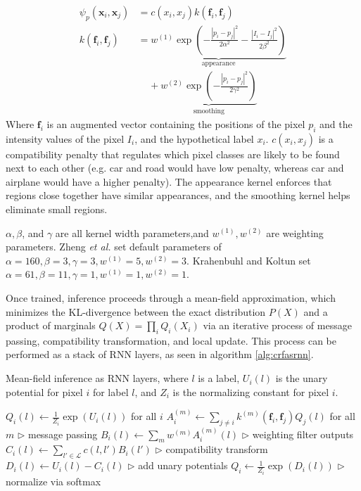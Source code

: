 \documentclass[10pt,twocolumn,letterpaper]{article}
\begin{document}
\begin{equation}
\begin{aligned}
\psi_p(\mathbf{x}_i, \mathbf{x}_j) &= c(x_i, x_j) k(\mathbf{f}_i, \mathbf{f}_j) \\
 k(\mathbf{f}_i, \mathbf{f}_j) &= \underbrace{w^{(1)} \exp \left( - \frac{|p_i - p_j|^2}{2\alpha^2} - \frac{|I_i - I_j|^2}{2\beta^2} \right)}_{\text{appearance}} \\ &\:\:\:\:\: + \underbrace{w^{(2)} \exp \left( - \frac{|p_i - p_j|^2}{2\gamma^2} \right)}_{\text{smoothing}} 
\end{aligned}
\end{equation}
Where $\mathbf{f}_i$ is an augmented vector containing the positions of the pixel $p_i$ and the intensity values of the pixel $I_i$, and the hypothetical label $x_i$. $c(x_i, x_j)$
is a compatibility penalty that regulates which pixel classes are likely to be found next to each other (e.g. car and road would have low penalty, whereas car and airplane would have a higher penalty).
The appearance kernel enforces that regions close together have similar appearances, and the smoothing kernel helps eliminate small regions. 

$\alpha, \beta$, and $\gamma$ are all kernel width parameters,and $w^{(1)}, w^{(2)}$ are weighting parameters. Zheng \textit{et al.}  set default parameters of $\alpha = 160, \beta=3, \gamma=3, w^{(1)}=5, w^{(2)}=3$. Krahenbuhl and Koltun set $\alpha = 61, \beta=11, \gamma=1, w^{(1)}=1, w^{(2)}=1$.

Once trained, inference proceeds through a mean-field 
approximation, which minimizes the KL-divergence between the exact distribution $P(X)$ and a product of marginals $Q(X) = \prod_i Q_i(X_i)$ via an iterative process of message passing, compatibility 
transformation, and local update. This process can be performed as a stack of RNN layers, as seen in algorithm \ref{alg:crfasrnn}.

\begin{algorithm}[h!]
\caption{Mean-field inference as RNN layers, where $l$ is a label, $U_i(l)$ is the unary potential for pixel $i$ for label $l$, and $Z_i$ is the normalizing constant for pixel $i$.}
\label{alg:crfasrnn}
\begin{algorithmic}
\State $Q_i(l) \gets \frac1{Z_i} \exp \left( U_i(l) \right)$ for all $i$
    \State $A_i^{(m)} \gets \sum_{j \neq i} k^{(m)}(\mathbf{f}_i, \mathbf{f}_j)Q_j(l)$ for all $m$
    \State            \:\:\:\:\:$\triangleright$ message passing
    \State $B_i(l) \gets \sum_m w^{(m)} A^{(m)}_i(l)$ 
    \State            \:\:\:\:\:$\triangleright$ weighting filter outputs
    \State $C_i(l) \gets \sum_{l' \in \mathcal{L}} c(l, l')B_i(l')$ 
    \State            \:\:\:\:\:$\triangleright$ compatibility transform
    \State $D_i(l) \gets U_i(l) - C_i(l)$ 
    \State            \:\:\:\:\:$\triangleright$ add unary potentials
    \State $Q_i \gets \frac1{Z_i} \exp(D_i(l))$ 
    \State            \:\:\:\:\:$\triangleright$ normalize via softmax
\EndWhile
\end{algorithmic}
\end{algorithm}
\end{document}
